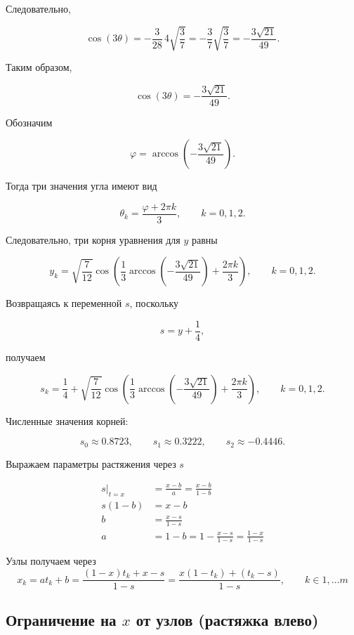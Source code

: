 \documentclass[12pt,a4paper]{article}
\begin{document}
	Следовательно,
	
	$$
	\cos(3\theta)
	=
	-\frac3{28}\,4\sqrt{\frac37}
	=
	-\frac3{7}\sqrt{\frac37}
	=
	-\frac{3\sqrt{21}}{49}.
	$$
	
	Таким образом,
	
	$$
	\boxed{
		\cos(3\theta)=-\frac{3\sqrt{21}}{49}.
	}
	$$
	
	Обозначим
	
	$$
	\varphi=
	\arccos\left(-\frac{3\sqrt{21}}{49}\right).
	$$
	
	Тогда три значения угла имеют вид
	
	$$
	\theta_k=\frac{\varphi+2\pi k}{3},
	\qquad
	k=0,1,2.
	$$
	
	Следовательно, три корня уравнения для $y$ равны
	
	$$
	y_k=
	\sqrt{\frac7{12}}
	\cos\left(
	\frac13
	\arccos\left(-\frac{3\sqrt{21}}{49}\right)
	+\frac{2\pi k}{3}
	\right),
	\qquad
	k=0,1,2.
	$$
	
	Возвращаясь к переменной $s$, поскольку
	
	$$
	s=y+\frac14,
	$$
	
	получаем
	
	$$
	\boxed{
		s_k=
		\frac14+
		\sqrt{\frac7{12}}
		\cos\left(
		\frac13
		\arccos\left(-\frac{3\sqrt{21}}{49}\right)
		+\frac{2\pi k}{3}
		\right),
		\qquad
		k=0,1,2.
	}
	$$
	
	Численные значения корней:
	
	$$
	\boxed{
		s_0 \approx 0.8723,
		\qquad
		s_1 \approx 0.3222,
		\qquad
		s_2 \approx -0.4446.
	}
	$$
	
	\noindent Выражаем параметры растяжения через $s$
	
	\begin{align*}
		s |_{t=x} &= \frac{x-b}{a} = \frac{x-b}{1-b}\\
		s (1-b) &= x-b\\
		b &= \frac{x-s}{1-s}\\
		a &= 1-b = 1-\frac{x-s}{1-s}
		= \frac{1-x}{1-s}
	\end{align*}
	
	\noindent Узлы получаем через
	\[
	x_k = a t_k + b =
	\frac{(1-x)t_k + x-s}{1-s} =
	\frac{ x(1 - t_k)  + (t_k - s)}{1-s}  ,
	\qquad
	k \in 1, \ldots m
	\]
	
	
	
	\subsection{Ограничение на $x$ от узлов (растяжка влево) }
	
\end{document}
